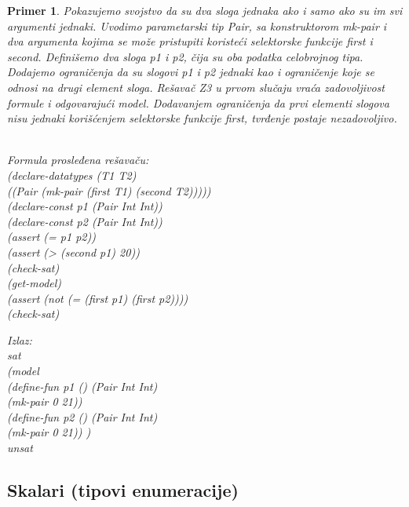 \documentclass[12pt,oneside]{memoir}
\newtheorem{primer}{Primer}
\begin{document}
\begin{primer} Pokazujemo svojstvo da su dva sloga jednaka ako i samo ako su im svi argumenti jednaki. Uvodimo parametarski tip Pair, sa konstruktorom mk-pair i dva argumenta kojima se može pristupiti koristeći selektorske funkcije first i second. Definišemo dva sloga p1 i p2, čija su oba podatka celobrojnog tipa. Dodajemo ograničenja da su slogovi p1 i p2 jednaki kao i ograničenje koje se odnosi na drugi element sloga. Rešavač Z3 u prvom slučaju vraća zadovoljivost formule i odgovarajući model. Dodavanjem ograničenja da prvi elementi slogova nisu jednaki korišćenjem selektorske funkcije first, tvrđenje postaje nezadovoljivo.
\\ \\
\begin{minipage}[b]{0.5\textwidth}
Formula prosleđena rešavaču:
\\(declare-datatypes (T1 T2) 
\\((Pair (mk-pair (first T1) (second T2)))))
\\(declare-const p1 (Pair Int Int))
\\(declare-const p2 (Pair Int Int))
\\(assert (= p1 p2))
\\(assert (> (second p1) 20))
\\(check-sat)
\\(get-model)
\\(assert (not (= (first p1) (first p2))))
\\(check-sat)
\end{minipage}
\hspace{2cm} 
\begin{minipage}[t]{0.5\textwidth}
\vspace{-6.5cm}
Izlaz:
\\sat 
\\(model 
\\(define-fun p1 () (Pair Int Int) 
\\(mk-pair 0 21)) 
\\(define-fun p2 () (Pair Int Int) 
\\(mk-pair 0 21)) )
\\unsat
\end{minipage}

\end{primer}
\subsection{Skalari (tipovi enumeracije)}
\end{document}
